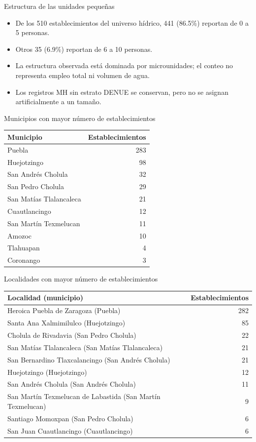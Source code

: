 \documentclass[aspectratio=169]{beamer}
\begin{document}
\begin{frame}{Estructura de las unidades pequeñas}
\begin{itemize}
\item De los 510 establecimientos del universo hídrico,
441 (86.5\%) reportan de 0 a 5 personas.
\item Otros 35 (6.9\%) reportan de 6 a 10 personas.
\item La estructura observada está dominada por microunidades; el conteo no representa empleo total ni volumen de agua.
\item Los registros MH sin estrato DENUE se conservan, pero no se asignan artificialmente a un tamaño.
\end{itemize}
\end{frame}
\begin{frame}{Municipios con mayor número de establecimientos}
\centering\small
\begin{tabular}{lr}\toprule Municipio & Establecimientos\\\midrule
Puebla & 283\\
Huejotzingo & 98\\
San Andrés Cholula & 32\\
San Pedro Cholula & 29\\
San Matías Tlalancaleca & 21\\
Cuautlancingo & 12\\
San Martín Texmelucan & 11\\
Amozoc & 10\\
Tlahuapan & 4\\
Coronango & 3\\
\bottomrule\end{tabular}
\end{frame}
\begin{frame}{Localidades con mayor número de establecimientos}
\centering\scriptsize
\begin{tabular}{lr}\toprule Localidad (municipio) & Establecimientos\\\midrule
Heroica Puebla de Zaragoza (Puebla) & 282\\
Santa Ana Xalmimilulco (Huejotzingo) & 85\\
Cholula de Rivadavia (San Pedro Cholula) & 22\\
San Matías Tlalancaleca (San Matías Tlalancaleca) & 21\\
San Bernardino Tlaxcalancingo (San Andrés Cholula) & 21\\
Huejotzingo (Huejotzingo) & 12\\
San Andrés Cholula (San Andrés Cholula) & 11\\
San Martín Texmelucan de Labastida (San Martín Texmelucan) & 9\\
Santiago Momoxpan (San Pedro Cholula) & 6\\
San Juan Cuautlancingo (Cuautlancingo) & 6\\
\bottomrule\end{tabular}
\end{frame}
\end{document}
